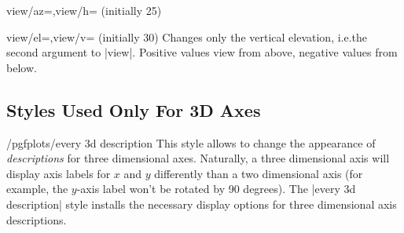 {\begin{pgfplotskeylist}{view/az=,view/h= (initially 25)}
\pgfplotsexpensiveexample
\begin{codeexample}[]
\end{codeexample}

\pgfplotsexpensiveexample
\begin{codeexample}[]
\end{codeexample}
\end{pgfplotskeylist}

\begin{pgfplotskeylist}{view/el=,view/v= (initially 30)}
    Changes only the vertical elevation, i.e.\@ the second argument to |view|.
    Positive values view from above, negative values from below.
\end{pgfplotskeylist}


\subsection{Styles Used Only For 3D Axes}

\begin{stylekey}{/pgfplots/every 3d description}
    This style allows to change the appearance of \emph{descriptions} for three
    dimensional axes. Naturally, a three dimensional axis will display axis
    labels for $x$ and $y$ differently than a two dimensional axis (for
    example, the $y$-axis label won't be rotated by 90 degrees). The
    |every 3d description| style installs the necessary display options for
    three dimensional axis descriptions.


\end{stylekey}}
